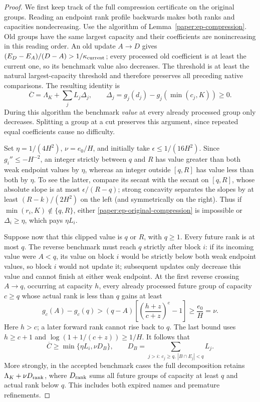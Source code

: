 \begin{proof}
We first keep track of the full compression certificate on the original
groups.  Reading an endpoint rank profile backwards makes both ranks
and capacities nondecreasing.  Use the algorithm of
Lemma~\ref{paper:ep-compression}.  Old groups have the same largest
capacity and their coefficients are nonincreasing in this reading
order.  An old update $A\to D$ gives
$(E_D-E_A)/(D-A)>1/\kappa_{\rm current}$; every processed old
coefficient is at least the current one, so its benchmark value also
decreases.  The threshold is at least the natural largest-capacity
threshold and therefore preserves all preceding native comparisons.
The resulting identity is
\begin{equation}\label{paper:ep-original-compression}
 \overline C=\Lambda_K+\sum_jL_j\Delta_j,\qquad
 \Delta_j=g_j(d_j)-g_j(\min(c_j,K))\geq0.
\end{equation}
During this algorithm the benchmark \emph{value} at every already
processed group only decreases.  Splitting a group at a cut preserves
this argument, since repeated equal coefficients cause no difficulty.

Set $\eta=1/(4H^2)$, $\nu=e_0/H$, and initially take
$\epsilon\leq1/(16H^2)$.  Since $g_i''\leq-H^{-2}$, an integer
strictly between $q$ and $R$ has value greater than both weak endpoint
values by $\eta$, whereas an integer outside $[q,R]$ has value less
than both by $\eta$.  To see the latter, compare its secant with the
secant on $[q,R]$, whose absolute slope is at most
$\epsilon/(R-q)$; strong concavity separates the slopes by at least
$(R-k)/(2H^2)$ on the left (and symmetrically on the right).
Thus if $\min(r_i,K)\notin\{q,R\}$, either
\eqref{paper:ep-original-compression} is impossible or
$\Delta_i\geq\eta$, which pays $\eta L_i$.

Suppose now that this clipped value is $q$ or $R$, with $q\geq1$.
Every future rank is at most $q$.  The reverse benchmark must reach
$q$ strictly after block $i$: if its incoming value were $A<q$, its
value on block $i$ would be strictly below both weak endpoint values,
so block $i$ would not update it; subsequent updates only decrease
this value and cannot finish at either weak endpoint.  At the first
reverse crossing $A\to q$, occurring at capacity $h$, every already
processed future group of capacity $c\geq q$ whose actual rank is
less than $q$ gains at least
\begin{equation}\label{paper:ep-deadline-charge}
 g_c(A)-g_c(q)
 >(q-A)\left[\left(\frac{h+z}{c+z}\right)^e-1\right]
 \geq \frac{e_0}{H}=\nu.
\end{equation}
Here $h>c$; a later forward rank cannot rise back to $q$.
The last bound uses $h\geq c+1$ and
$\log(1+1/(c+z))\geq1/H$.  It follows that
\[
 \overline C\geq\min\{\eta L_i,\nu D_B\},\qquad
 D_B=\sum_{j>i:\ c_j\geq q,\ |B\cap E_j|<q}L_j.
\]
More strongly, in the accepted benchmark cases the full decomposition
retains $\Lambda_K+\nu D_{\rm rank}$, where $D_{\rm rank}$ sums all
future groups of capacity at least $q$ and actual rank below $q$.
This includes both expired names and premature refinements.


\end{proof}
